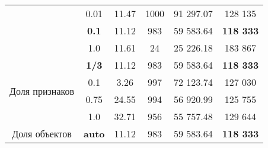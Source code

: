 \documentclass[a4paper, 14pt]{article}
\begin{document}
\begin{table}[]
\begin{tabular}{@{}cc|cccc@{}}
                                                                                    & 0.01                                                    & 11.47    & 1000           & 91 297.07                                                            & 128 135                                                                \\
                                                                                    & \textbf{0.1}                                            & 11.12    & 983            & 59 583.64                                                            & \textbf{118 333}                                                       \\
                                                                                    & 1.0                                                     & 11.61    & 24             & 25 226.18                                                            & 183 867                                                                \\ \midrule
    \multirow{4}{*}{Доля признаков}                                                 & \textbf{1/3}                                            & 11.12    & 983            & 59 583.64                                                            & \textbf{118 333}                                                       \\
                                                                                    & 0.1                                                     & 3.26     & 997            & 72 123.74                                                            & 127 030                                                                \\
                                                                                    & 0.75                                                    & 24.55    & 994            & 56 920.99                                                            & 125 755                                                                \\
                                                                                    & 1.0                                                     & 32.71    & 956            & 55 757.48                                                            & 129 644                                                                \\ \midrule
    \multirow{4}{*}{Доля объектов}                                                  & \textbf{auto}                                           & 11.12    & 983            & 59 583.64                                                            & \textbf{118 333}                                                       \\

\end{tabular}
\end{table}
\end{document}
